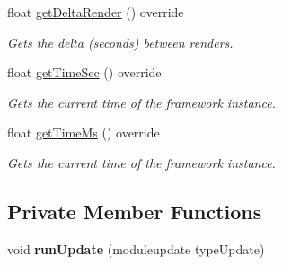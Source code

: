 \begin{DoxyCompactItemize}
float \hyperlink{classflounder_1_1glfwupdater_aad1dda11a40273c2a18e7974f42f59dc}{get\+Delta\+Render} () override
\begin{DoxyCompactList}\small\item\em Gets the delta (seconds) between renders. \end{DoxyCompactList}\item 
float \hyperlink{classflounder_1_1glfwupdater_a01b583f6e4b5ae90eb9d74f931d80081}{get\+Time\+Sec} () override
\begin{DoxyCompactList}\small\item\em Gets the current time of the framework instance. \end{DoxyCompactList}\item 
float \hyperlink{classflounder_1_1glfwupdater_ac27f7a962d72e4dff8e13db7d84647ba}{get\+Time\+Ms} () override
\begin{DoxyCompactList}\small\item\em Gets the current time of the framework instance. \end{DoxyCompactList}\end{DoxyCompactItemize}
\subsection*{Private Member Functions}
\begin{DoxyCompactItemize}
\item 
\mbox{\label{classflounder_1_1glfwupdater_a8a9f6bcd682f3661de18799669c0a4b4}} 
void {\bfseries run\+Update} (moduleupdate type\+Update)
\end{DoxyCompactItemize}
